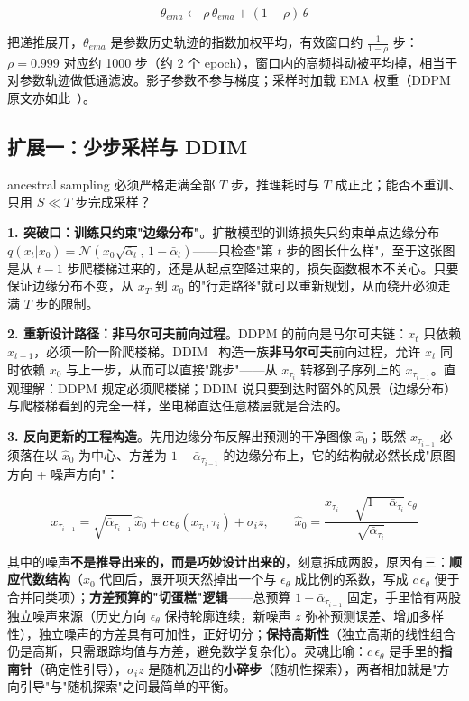 \documentclass[11pt]{article}
\begin{document}
\begin{equation}
    \boxed{\theta_{ema} \leftarrow \rho\,\theta_{ema} + (1-\rho)\,\theta}
\end{equation}

把递推展开，$\theta_{ema}$ 是参数历史轨迹的指数加权平均，有效窗口约 $\frac{1}{1-\rho}$ 步：$\rho=0.999$ 对应约 1000 步（约 2 个 epoch），窗口内的高频抖动被平均掉，相当于对参数轨迹做低通滤波。影子参数不参与梯度；采样时加载 EMA 权重（DDPM 原文亦如此~\parencite{ho2020denoising}）。

\subsection{扩展一：少步采样与 DDIM}
\label{sec:ddim}

ancestral sampling 必须严格走满全部 $T$ 步，推理耗时与 $T$ 成正比；能否不重训、只用 $S \ll T$ 步完成采样？

\textbf{1. 突破口：训练只约束"边缘分布"}。扩散模型的训练损失只约束单点边缘分布 $q(x_t|x_0)=\mathcal{N}(x_0\sqrt{\bar{\alpha}_t},\,1-\bar{\alpha}_t)$——只检查"第 $t$ 步的图长什么样"，至于这张图是从 $t-1$ 步爬楼梯过来的，还是从起点空降过来的，损失函数根本不关心。只要保证边缘分布不变，从 $x_T$ 到 $x_0$ 的"行走路径"就可以重新规划，从而绕开必须走满 $T$ 步的限制。

\textbf{2. 重新设计路径：非马尔可夫前向过程}。DDPM 的前向是马尔可夫链：$x_t$ 只依赖 $x_{t-1}$，必须一阶一阶爬楼梯。DDIM~\parencite{song2021ddim} 构造一族\textbf{非马尔可夫}前向过程，允许 $x_t$ 同时依赖 $x_0$ 与上一步，从而可以直接"跳步"——从 $x_{\tau_i}$ 转移到子序列上的 $x_{\tau_{i-1}}$。直观理解：DDPM 规定必须爬楼梯；DDIM 说只要到达时窗外的风景（边缘分布）与爬楼梯看到的完全一样，坐电梯直达任意楼层就是合法的。

\textbf{3. 反向更新的工程构造}。先用边缘分布反解出预测的干净图像 $\hat{x}_0$；既然 $x_{\tau_{i-1}}$ 必须落在以 $\hat{x}_0$ 为中心、方差为 $1-\bar{\alpha}_{\tau_{i-1}}$ 的边缘分布上，它的结构就必然长成"原图方向 + 噪声方向"：

\begin{equation}
    x_{\tau_{i-1}} = \sqrt{\bar{\alpha}_{\tau_{i-1}}}\,\hat{x}_0 + c\,\epsilon_\theta(x_{\tau_i},\tau_i) + \sigma_i z,
    \qquad
    \hat{x}_0 = \frac{x_{\tau_i} - \sqrt{1-\bar{\alpha}_{\tau_i}}\,\epsilon_\theta}{\sqrt{\bar{\alpha}_{\tau_i}}}
\end{equation}

其中的噪声\textbf{不是推导出来的，而是巧妙设计出来的}，刻意拆成两股，原因有三：\textbf{顺应代数结构}（$\hat{x}_0$ 代回后，展开项天然掉出一个与 $\epsilon_\theta$ 成比例的系数，写成 $c\,\epsilon_\theta$ 便于合并同类项）；\textbf{方差预算的"切蛋糕"逻辑}——总预算 $1-\bar{\alpha}_{\tau_{i-1}}$ 固定，手里恰有两股独立噪声来源（历史方向 $\epsilon_\theta$ 保持轮廓连续，新噪声 $z$ 弥补预测误差、增加多样性），独立噪声的方差具有可加性，正好切分；\textbf{保持高斯性}（独立高斯的线性组合仍是高斯，只需跟踪均值与方差，避免数学复杂化）。灵魂比喻：$c\,\epsilon_\theta$ 是手里的\textbf{指南针}（确定性引导），$\sigma_i z$ 是随机迈出的\textbf{小碎步}（随机性探索），两者相加就是"方向引导"与"随机探索"之间最简单的平衡。
\end{document}
